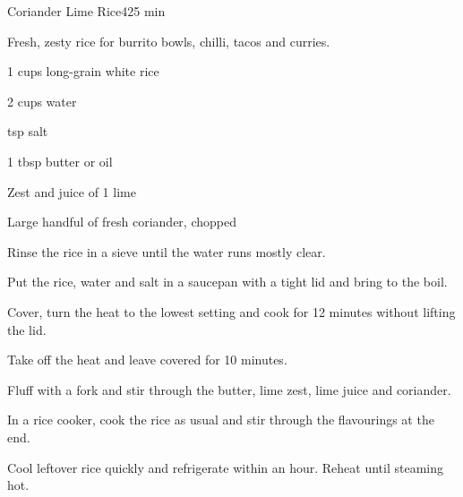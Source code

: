 \begin{recipebox}{Coriander Lime Rice}{4}{25 min}

Fresh, zesty rice for burrito bowls, chilli, tacos and curries.

\begin{ingredients}
  \item 1 cups long-grain white rice
  \item 2 cups water
  \item {} tsp salt
  \item 1 tbsp butter or oil
  \item Zest and juice of 1 lime
  \item Large handful of fresh coriander, chopped
\end{ingredients}

\begin{method}
  \item Rinse the rice in a sieve until the water runs mostly clear.
  \item Put the rice, water and salt in a saucepan with a tight lid and bring to the boil.
  \item Cover, turn the heat to the lowest setting and cook for 12 minutes without lifting the lid.
  \item Take off the heat and leave covered for 10 minutes.
  \item Fluff with a fork and stir through the butter, lime zest, lime juice and coriander.
\end{method}

\begin{notelist}
  \item In a rice cooker, cook the rice as usual and stir through the flavourings at the end.
  \item Cool leftover rice quickly and refrigerate within an hour. Reheat until steaming hot.
\end{notelist}

\end{recipebox}
